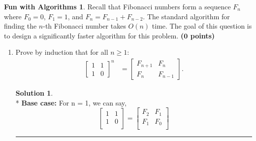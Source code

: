 \documentclass{article}
\theoremstyle{definition}
\newtheorem*{fun}{Fun with Algorithms}
\def\fline{\rule{0.75\linewidth}{0.5pt}}
\newcommand{\finishline}{\vspace{-15pt}\begin{center}\fline\end{center}}
\newtheorem*{solution*}{Solution}
\newenvironment{solution}{\begin{solution*}}{{\finishline} \end{solution*}}
\newcommand{\grade}[1]{\hfill{\textbf{($\mathbf{#1}$ points)}}}
\begin{document}
\begin{fun}
Recall that Fibonacci numbers form a sequence $F_n$ where $F_0 = 0$, $F_1 = 1$, and $F_n = F_{n-1} + F_{n-2}$. 
The standard algorithm for finding the $n$-th Fibonacci number takes $O(n)$ time. The goal of this question is to design a significantly faster algorithm for this problem. \grade{0}
	\begin{enumerate}[label=(\alph*)]
		\item Prove by induction that for all $n \geq 1$: 
		\begin{align*}
			\begin{bmatrix}
				1 & 1 \\
				1 & 0
			\end{bmatrix}^n
			&= 	\begin{bmatrix}
				F_{n+1} & F_n \\
				F_n & F_{n-1}
			\end{bmatrix}.
		\end{align*}
		\begin{solution}
		\hfill \bigskip\\*
		\textbf{Base case: }For n = 1, we can say,
		\[
			\begin{bmatrix}
			    1       & 1  \\
			    1       & 0  \\
			   
			\end{bmatrix}
			=
			\begin{bmatrix}
			    F_2       & F_1  \\
			    F_1       &F_ 0  \\
			   

\end{bmatrix}\]
\end{solution}
\end{enumerate}
\end{fun}
\end{document}
